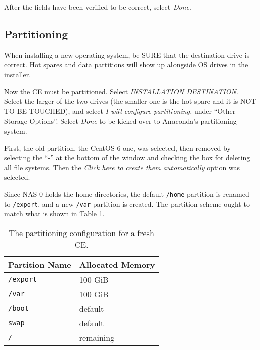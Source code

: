 \documentclass[12pt]{article}
\begin{document}
After the fields have been verified to be correct, select \textit{Done}.

\subsection{Partitioning}

\begin{tcolorbox}[title=WARNING, colback=white, colframe=yellow, coltitle=black]
  When installing a new operating system, be SURE that the destination drive is
  correct. Hot spares and data partitions will show up alongside OS drives in
  the installer.
\end{tcolorbox}

\qq Now the CE must be partitioned. Select \textit{INSTALLATION
  DESTINATION}. Select the larger of the two drives (the smaller one is the hot
spare and it is NOT TO BE TOUCHED), and select \textit{I will configure
  partitioning.} under ``Other Storage Options''. Select \textit{Done} to be
kicked over to Anaconda's partitioning system.

\qq First, the old partition, the CentOS 6 one, was selected, then removed by
selecting the ``-'' at the bottom of the window and checking the box for
deleting all file systems. Then the \textit{Click here to
  create them automatically} option was selected.

\qq Since NAS-0 holds the home directories, the default {\tt /home} partition is
renamed to {\tt /export}, and a new {\tt /var} partition is created. The
partition scheme ought to match what is shown in Table \ref{tab:partition}.


\begin{table}[H]
  \caption{The partitioning configuration for a fresh CE.}
  \begin{center}
    \begin{tabular}{|l|l|}
      \hline
      Partition Name & Allocated Memory \\
      \hline
      {\tt /export} & 100 GiB \\
      {\tt /var} & 100 GiB \\
      {\tt /boot} & default \\
      {\tt swap} & default \\
      {\tt /} & remaining \\
      \hline
    \end{tabular}
  \end{center}
  \label{tab:partition}
\end{table}
\end{document}
